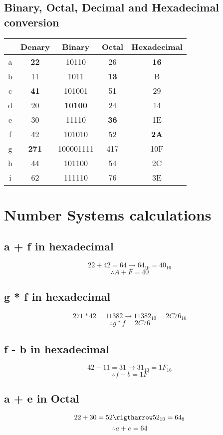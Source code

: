 \documentclass{article}
\begin{document}
\subsection{Binary, Octal, Decimal and Hexadecimal conversion}
\begin{center}
\begin{tabular}{ ||c|c c c c|| } 
 \hline
   & Denary & Binary & Octal & Hexadecimal \\
 \hline
 \hline
 a & \textbf{22} & 10110 & 26 & \textbf{16} \\ 
 \hline
 b & 11 & 1011 & \textbf{13} & B \\ 
 \hline
 c & \textbf{41} & 101001 & 51 & 29 \\ 
 \hline
 d & 20 & \textbf{10100} & 24 & 14 \\ 
 \hline
 e & 30 & 11110 & \textbf{36} & 1E \\ 
 \hline
 f & 42 & 101010 & 52 & \textbf{2A} \\
 \hline
 g & \textbf{271} & 100001111 & 417 & 10F\\ 
 \hline
 h & 44 & 101100 & 54 & 2C \\ 
 \hline
 i & 62 & 111110 & 76 & 3E \\ 
 \hline
\end{tabular}
\end{center}
\section{Number Systems calculations}
\subsection{a + f in hexadecimal}
\[
	22 + 42 = 64 \rightarrow 64_{10} = 40_{16}
\]
\[
	\therefore A+F = 40
\]
\subsection{g * f in hexadecimal}
\[
	271 * 42 = 11382 \rightarrow 11382_{10} = 2C76_{16}
\]
\[
	\therefore g * f = 2C76
\]
\subsection{f - b in hexadecimal}
\[
	42 - 11 = 31 \rightarrow  31_{10} = 1F_{16}
\]
\[
	\therefore f - b = 1F
\]
\subsection{a + e in Octal}
\[
	22 + 30 = 52 \rigtharrow 52_{10} = 64_{8}
\]
\[
	\therefore a + e = 64
\]
\end{document}
